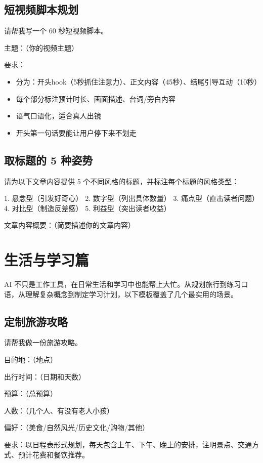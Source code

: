 \subsection*{短视频脚本规划}

\begin{promptbox}
请帮我写一个 60 秒短视频脚本。

主题：（你的视频主题）

要求：
\begin{itemize}
  \item 分为：开头hook（5秒抓住注意力）、正文内容（45秒）、结尾引导互动（10秒）
  \item 每个部分标注预计时长、画面描述、台词/旁白内容
  \item 语气口语化，适合真人出镜
  \item 开头第一句话要能让用户停下来不划走
\end{itemize}
\end{promptbox}

\subsection*{取标题的 5 种姿势}

\begin{promptbox}
请为以下文章内容提供 5 个不同风格的标题，并标注每个标题的风格类型：

1. 悬念型（引发好奇心）
2. 数字型（列出具体数量）
3. 痛点型（直击读者问题）
4. 对比型（制造反差感）
5. 利益型（突出读者收益）

文章内容概要：（简要描述你的文章内容）
\end{promptbox}

\section{生活与学习篇}

AI 不只是工作工具，在日常生活和学习中也能帮上大忙。从规划旅行到练习口语，从理解复杂概念到制定学习计划，以下模板覆盖了几个最实用的场景。

\subsection*{定制旅游攻略}

\begin{promptbox}
请帮我做一份旅游攻略。

目的地：（地点）

出行时间：（日期和天数）

预算：（总预算）

人数：（几个人、有没有老人小孩）

偏好：（美食/自然风光/历史文化/购物/其他）

要求：以日程表形式规划，每天包含上午、下午、晚上的安排，注明景点、交通方式、预计花费和餐饮推荐。
\end{promptbox}


